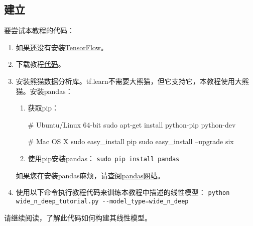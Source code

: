 \subsection{建立}
要尝试本教程的代码：
\begin{enumerate}
\item  如果还没有\href{https://www.tensorflow.org/install/index}{安装TensorFlow}。
\item 下载教程\href{https://www.github.com/tensorflow/tensorflow/blob/r1.3/tensorflow/examples/learn/wide_n_deep_tutorial.py}{代码}。
\item 安装熊猫数据分析库。tf.learn不需要大熊猫，但它支持它，本教程使用大熊猫。安装pandas：
	\begin{enumerate}
			\item 获取pip：
			\begin{python}
				# Ubuntu/Linux 64-bit
        	                sudo apt-get install python-pip python-dev
	
				# Mac OS X
				sudo easy_install pip
				sudo easy_install --upgrade six
			\end{python}

		\item 使用pip安装pandas：
			\lstinline[language=Python]{sudo pip install pandas}
	\end{enumerate}


如果您在安装pandas麻烦，请查阅\href{http://pandas.pydata.org/pandas-docs/stable/install.html}{pandas网站}。
\item 使用以下命令执行教程代码来训练本教程中描述的线性模型：
	\lstinline[language=Python]{python wide_n_deep_tutorial.py --model_type=wide_n_deep}
\end{enumerate}
请继续阅读，了解此代码如何构建其线性模型。
